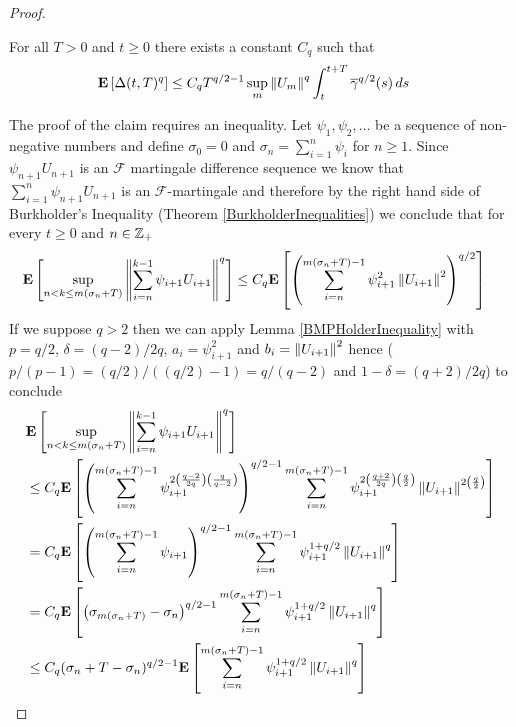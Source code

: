 \begin{proof}
\begin{clm}For all $T > 0$ and $t \geq 0$ there exists a constant $C_q$ such that
\begin{align*}
\textbf{E}\left[\Delta(t, T)^q\right] &\leq C_q  T^{q/2 -1} \sup_m \left \lVert U_m \right \rVert^q \int_{t}^{t+T} \overline{\gamma}^{q/2}(s) \, ds
\end{align*}
\end{clm}
The proof of the claim requires an inequality.  Let $\psi_1, \psi_2, \dotsc$ be a sequence of non-negative numbers and define $\sigma_0=0$ and $\sigma_n = \sum_{i=1}^n \psi_i$ for $n \geq 1$.   Since $\psi_{n+1} U_{n+1}$ is an $\mathcal{F}$ martingale difference sequence we know that $\sum_{i=1}^n \psi_{n+1} U_{n+1}$ is an $\mathcal{F}$-martingale and therefore by 
the right hand side of Burkholder's Inequality (Theorem \ref{BurkholderInequalities}) we conclude that for every $t \geq 0$ and $n \in \mathbb{Z}_+$
\begin{align*}
\textbf{E}\left[\sup_{n < k \leq m(\sigma_n + T)} \left \lVert \sum_{i=n}^{k-1} \psi_{i+1} U_{i+1} \right \rVert^q\right] &\leq C_q \textbf{E}\left[\left(\sum_{i=n}^{m(\sigma_n + T)-1} \psi^2_{i+1}\left \lVert  U_{i+1} \right \rVert^2\right)^{q/2}\right]
\end{align*}
If we suppose $q > 2$ then we can apply Lemma \ref{BMPHolderInequality} with $p=q/2$, $\delta=(q-2)/2q$, $a_i=\psi^2_{i+1}$ and $b_i = \left \lVert U_{i+1} \right \rVert^2$ hence ($p/(p-1) = (q/2)/((q/2)-1) = q/(q-2)$ and $1-\delta = (q+2)/2q$)  to conclude
\begin{align*}
&\expectation{\sup_{n < k \leq m(\sigma_n + T)} \norm{\sum_{i=n}^{k-1} \psi_{i+1} U_{i+1}}^q} \\
&\leq C_q \expectation{\left(\sum_{i=n}^{m(\sigma_n + T)-1} \psi^{2\left( \frac{q-2}{2q} \right) \left ( \frac{q}{q-2} \right)}_{i+1}\right)^{q/2-1} \sum_{i=n}^{m(\sigma_n + T)-1} \psi_{i+1}^{2\left( \frac{q+2}{2q} \right) \left( \frac{q}{2} \right)} \norm{U_{i+1}}^{2 \left(\frac{q}{2} \right)}} \\
&= C_q \expectation{\left(\sum_{i=n}^{m(\sigma_n + T)-1} \psi_{i+1}\right)^{q/2-1} \sum_{i=n}^{m(\sigma_n + T)-1} \psi_{i+1}^{1+q/2} \norm{U_{i+1}}^{q}} \\
&= C_q \expectation{\left(\sigma_{m(\sigma_n+T)} - \sigma_n \right)^{q/2-1} \sum_{i=n}^{m(\sigma_n + T)-1} \psi_{i+1}^{1+q/2} \norm{U_{i+1}}^{q}} \\
&\leq C_q (\sigma_n + T - \sigma_n)^{q/2 -1} \expectation{\sum_{i=n}^{m(\sigma_n + T)-1} \psi_{i+1}^{1+q/2} \norm{U_{i+1}}^{q}} \\

\end{align*}
\end{proof}

